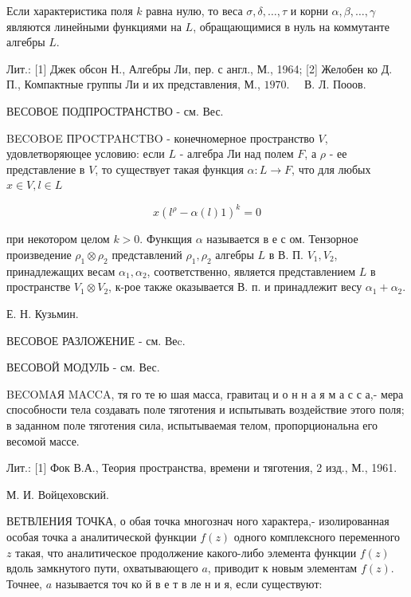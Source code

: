 \documentclass[10pt]{article}
\begin{document}
Если характеристика поля $k$ равна нулю, то веса $\sigma, \delta, \ldots, \tau$ и корни $\alpha, \beta, \ldots, \gamma$ являются линейными функциями на $L$, обращающимися в нуль на коммутанте алгебры $L$.



Лит.: [1] Джек обсон Н., Алгебры Ли, пер. с англ., М., 1964; [2] Желобен ко Д. П., Компактные группы Ли и их представления, М., $1970 . \quad$ В. Л. Пооов.



ВЕСОВОЕ ПОДПРОСТРАНСТВО - см. Вес.



BECOBOE ПPOCTPAHCTBO - конечномерное пространство $V$, удовлетворяющее условию: если $L$ - алгебра Ли над полем $F$, а $\rho$ - ее представление в $V$, то существует такая функция $\alpha: L \rightarrow F$, что для любых $x \in V, l \in L$



\[

x\left(l^{\rho}-\alpha(l) 1\right)^{k}=0

\]



при некотором целом $k>0$. Функщия $\alpha$ называется в е с ом. Тензорное произведение $\rho_{1} \otimes \rho_{2}$ представлений $\rho_{1}, \rho_{2}$ алгебры $L$ в В. П. $V_{1}, V_{2}$, принадлежащих весам $\alpha_{1}, \alpha_{2}$, соответственно, является представлением $L$ в пространстве $V_{1} \otimes V_{2}$, к-рое также оказывается В. п. и принадлежит весу $\alpha_{1}+\alpha_{2}$.



Е. Н. Кузьмин.



ВЕСОВОЕ РАЗЛОЖЕНИЕ - см. Веc.



ВЕСОВОЙ МОДУЛЬ - см. Вес.



BECOMAЯ MACCA, тя го те ю шая масса, гравитац и о н н а я м а с с а,- мера способности тела создавать поле тяготения и испытывать воздействие этого поля; в заданном поле тяготения сила, испытываемая телом, пропорциональна его весомой массе.



Лит.: [1] Фок В.А., Теория пространства, времени и тяготения, 2 изд., М., 1961.



М. И. Войцеховский.



ВЕТВЛЕНИЯ ТОЧКА, о обая точка многознач ного характера,- изолированная особая точка $а$ аналитической функции $f(z)$ одного комплексного переменного $z$ такая, что аналитическое продолжение какого-либо элемента функции $f(z)$ вдоль замкнутого пути, охватывающего $a$, приводит к новым элементам $f(z)$. Точнее, $a$ называется точ ко й в е т в ле н и я, если существуют:
\end{document}
